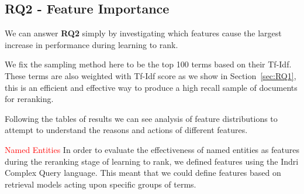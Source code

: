 \documentclass{mpaper}
\newcommand{\remove}[1]{\textcolor{red}{#1}}
\begin{document}
\begin{center}
\begin{table}[h]
\centering
{}
\caption{Recall with Different Retrieval Models, Query Size 100, Terms Weighted with Tf-Idf}
\label{sample_size_w}
\end{table}
\end{center}

\subsection{RQ2 - Feature Importance}
We can answer \textbf{RQ2} simply by investigating which features cause the largest increase in performance during learning to rank.

We fix the sampling method here to be the top 100 terms based on their Tf-Idf. These terms are also weighted with Tf-Idf score as we show in Section~\ref{sec:RQ1}, this is an efficient and effective way to produce a high recall sample of documents for reranking.

Following the tables of results we can see analysis of feature distributions to attempt to understand the reasons and actions of different features.

\remove{Named Entities}
In order to evaluate the effectiveness of named entities as features during the reranking stage of learning to rank, we defined features using the Indri Complex Query language.
This meant that we could define features based on retrieval models acting upon specific groups of terms.
\end{document}
